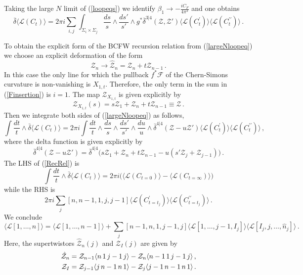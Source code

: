 \documentclass[12pt]{article}
\def \be  {\begin{equation}}
\def \ee  {\end{equation}}
\numberwithin{equation}{section}
\begin{document}
Taking the large $N$ limit of (\ref{loopeqs}) we identify $\beta_1 \rightarrow -\frac{iC_F}{4\pi^3}$ and one obtains
\be
\bar{\delta} \langle \mathcal{L}(C_t)\rangle = 2 \pi i \sum_{i,j} \int_{\Sigma_i \times \Sigma_j} \frac{ds}{s} \wedge\frac{ds'}{s'} \wedge g^* \bar{\delta}^{3|4}(\mathcal{Z},\mathcal{Z'}) \langle \mathcal{L}(C^\prime_t) \rangle \langle \mathcal{L}(C^{\prime \prime}_t)\rangle\,.
\label{largeNloopeq}
\ee

To obtain the explicit form of the BCFW recursion relation from (\ref{largeNloopeq}) we choose an explicit deformation of the form
\be
\mathcal{Z}_n \rightarrow \hat{\mathcal{Z}}_n = \mathcal{Z}_n + t \mathcal{Z}_{n-1}\,.
\label{BCFWshift}
\ee
In this case the only line for which the pullback $f^* \mathcal{F}$ of the Chern-Simons curvature is non-vanishing is $X_{1,t}$. Therefore, the only term in the sum in (\ref{Finsertion}) is $i=1$. The map $\mathcal{Z}_{X_{1,t}}$ is given explicitly by 
\be
\mathcal{Z}_{X_{1,t}}(s) = s \mathcal{Z}_1 + \mathcal{Z}_n + t \mathcal{Z}_{n-1} \equiv \mathcal{Z}\,.
\ee
Then we integrate both sides of (\ref{largeNloopeq}) as follows,
\be
\int \frac{dt}{t} \wedge \bar{\delta} \langle \mathcal{L}(C_t)\rangle = 2 \pi i  \int \frac{dt}{t} \wedge \frac{ds}{s} \wedge \frac{ds'}{s'} \wedge \frac{du}{u} \wedge  \bar{\delta}^{4|4}(\mathcal{Z} - u\mathcal{Z'}) \langle \mathcal{L}(C^\prime_t) \rangle \langle \mathcal{L}(C^{\prime \prime}_t)\rangle\,,
\label{RecRel}
\ee
where the delta function is given explicitly by
\be
\bar{\delta}^{4|4}(\mathcal{Z} - u\mathcal{Z'})=\bar{\delta}^{4|4}\bigl(s \mathcal{Z}_1 + \mathcal{Z}_n + t \mathcal{Z}_{n-1} - u(s' \mathcal{Z}_j + \mathcal{Z}_{j-1})\bigr)\,.
\ee
The LHS of (\ref{RecRel}) is
\be
\int \frac{dt}{t} \wedge \bar{\delta} \langle \mathcal{L}(C_t)\rangle = 2 \pi i \bigl(\langle \mathcal{L}(C_{t=0})\rangle - \langle \mathcal{L}(C_{t=\infty})\rangle\bigr)
\ee
while the RHS is 
\be
2 \pi i \sum_j 
[n,n-1,1,j,j-1]
\langle \mathcal{L}(C^\prime_{t=t_j}) \rangle \langle \mathcal{L}(C^{\prime \prime}_{t=t_j})\rangle\,.
\ee
We conclude
\be
\langle \mathcal{L}[1,\ldots,n] \rangle = \langle \mathcal{L}[1,\ldots,n-1]\rangle + \sum_j [n-1,n,1,j-1,j]\langle \mathcal{L}[1,\ldots,j-1,I_j]\rangle \langle \mathcal{L}[I_j,j,\ldots,\hat{n}_j]\rangle\,.
\label{BCFWlargeN}
\ee
Here, the supertwistors $\hat{\mathcal{Z}}_n(j)$ and $\mathcal{Z}_{I}(j)$ are given by
\begin{align}
    \hat{\mathcal{Z}}_n &= \mathcal{Z}_{n-1} \langle n \,1\,j-1\,j\rangle - \mathcal{Z}_n \langle n-1\,1\,j-1\,j\rangle\,, \notag \\
    \mathcal{Z}_I &= \mathcal{Z}_{j-1} \langle j\, n-1\, n \, 1\rangle - \mathcal{Z}_j \langle j-1\, n-1\, n\, 1 \rangle\,.
\end{align}
\end{document}
